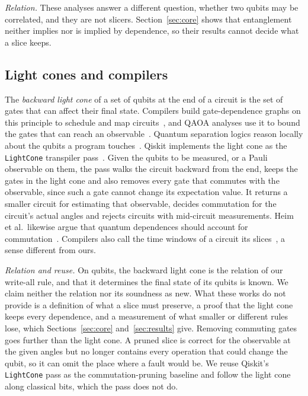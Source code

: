 \emph{Relation.} These analyses answer a different question, whether two qubits may be correlated, and they are not
slicers. Section~\ref{sec:core} shows that entanglement neither implies nor is implied by dependence, so their
results cannot decide what a slice keeps.

\subsection{Light cones and compilers}
The \emph{backward light cone} of a set of qubits at the end of a circuit is the set of gates that can affect their
final state. Compilers build gate-dependence graphs on this principle to schedule and map
circuits~\cite{murali2019triq, amy2020staq}, and QAOA analyses use it to bound the gates that can reach an
observable~\cite{farhi2014qaoa}. Quantum separation logics reason locally about the qubits a program
touches~\cite{zhou2021qsl, le2022qsl}. Qiskit implements the light cone as the \texttt{LightCone} transpiler
pass~\cite{qiskit2025}. Given the qubits to be measured, or a Pauli observable on them, the pass walks the circuit
backward from the end, keeps the gates in the light cone and also removes every gate that commutes with the
observable, since such a gate cannot change its expectation value. It returns a smaller circuit for estimating that
observable, decides commutation for the circuit's actual angles and rejects circuits with mid-circuit measurements.
Heim et al.\ likewise argue that quantum dependences should account for commutation~\cite{heim2020quantum}. Compilers
also call the time windows of a circuit its slices~\cite{smith2022timestitch}, a sense different from ours.

\emph{Relation and reuse.} On qubits, the backward light cone is the relation of our write-all rule, and that it
determines the final state of its qubits is known. We claim neither the relation nor its soundness as new. What these
works do not provide is a definition of what a slice must preserve, a proof that the light cone keeps every
dependence, and a measurement of what smaller or different rules lose, which Sections~\ref{sec:core}
and~\ref{sec:results} give. Removing commuting gates goes further than the light cone. A pruned slice is correct for
the observable at the given angles but no longer contains every operation that could change the qubit, so it can omit
the place where a fault would be. We reuse Qiskit's \texttt{LightCone} pass as the commutation-pruning baseline and
follow the light cone along classical bits, which the pass does not do.

